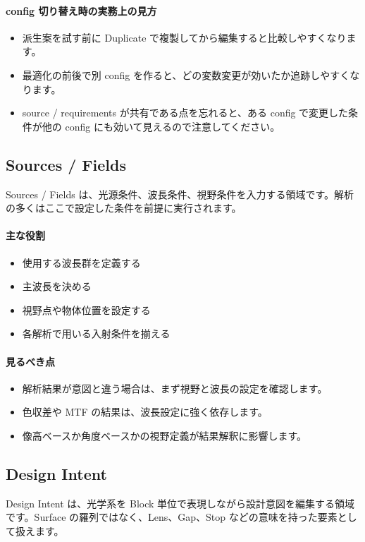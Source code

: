 \documentclass[11pt]{article}
\begin{document}
\paragraph{config 切り替え時の実務上の見方}
\begin{itemize}
  \item 派生案を試す前に Duplicate で複製してから編集すると比較しやすくなります。
  \item 最適化の前後で別 config を作ると、どの変数変更が効いたか追跡しやすくなります。
  \item source / requirements が共有である点を忘れると、ある config で変更した条件が他の config にも効いて見えるので注意してください。
\end{itemize}

\subsection{Sources / Fields}
Sources / Fields は、光源条件、波長条件、視野条件を入力する領域です。解析の多くはここで設定した条件を前提に実行されます。

\paragraph{主な役割}
\begin{itemize}
  \item 使用する波長群を定義する
  \item 主波長を決める
  \item 視野点や物体位置を設定する
  \item 各解析で用いる入射条件を揃える
\end{itemize}

\paragraph{見るべき点}
\begin{itemize}
  \item 解析結果が意図と違う場合は、まず視野と波長の設定を確認します。
  \item 色収差や MTF の結果は、波長設定に強く依存します。
  \item 像高ベースか角度ベースかの視野定義が結果解釈に影響します。
\end{itemize}

\subsection{Design Intent}
Design Intent は、光学系を Block 単位で表現しながら設計意図を編集する領域です。Surface の羅列ではなく、Lens、Gap、Stop などの意味を持った要素として扱えます。
\end{document}
